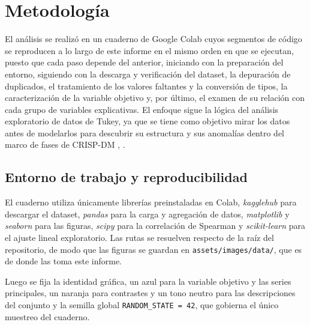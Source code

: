 \section{Metodología}
    El análisis se realizó en un cuaderno de Google Colab cuyos segmentos de
    código se reproducen a lo largo de este informe en el mismo orden en que se
    ejecutan, puesto que cada paso depende del anterior, iniciando con la
    preparación del entorno, siguiendo con la descarga y verificación del
    dataset, la depuración de duplicados, el tratamiento de los valores faltantes
    y la conversión de tipos, la caracterización de la variable objetivo y, por
    último, el examen de su relación con cada grupo de variables explicativas. El
    enfoque sigue la lógica del análisis exploratorio de datos de Tukey, ya que 
    se tiene como objetivo mirar los datos antes de modelarlos para descubrir 
    su estructura y sus anomalías dentro del marco de fases de CRISP-DM 
    \cite{tukey1977exploratory}, \cite{chapman2000crisp}.

    \subsection{Entorno de trabajo y reproducibilidad}
        El cuaderno utiliza únicamente librerías preinstaladas en Colab,
        \textit{kagglehub} para descargar el dataset, \textit{pandas} 
        para la carga y agregación de datos, \textit{matplotlib} y 
        \textit{seaborn} para las figuras, \textit{scipy} para la correlación 
        de Spearman y \textit{scikit-learn} para el ajuste lineal exploratorio. 
        Las rutas se resuelven respecto de la raíz del repositorio, de modo 
        que las figuras se guardan en \texttt{assets/images/data/}, que es de 
        donde las toma este informe.

        \vspace{10pt}

        

        \vspace{10pt}

        Luego se fija la identidad gráfica, un azul para la variable objetivo y
        las series principales, un naranja para contrastes y un tono neutro para
        las descripciones del conjunto y la semilla global \texttt{RANDOM\_STATE
        = 42}, que gobierna el único muestreo del cuaderno.

        \vspace{10pt}

